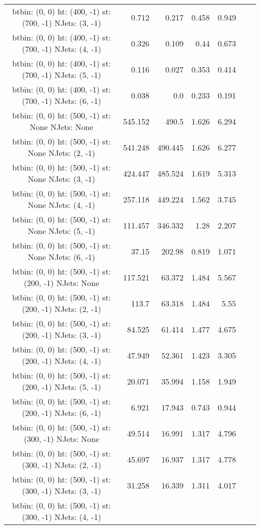 \documentclass[12pt]{paper}
\begin{document}
\begin{landscape}
\begin{longtable}{c|r|r|r|r|r|r}
btbin:  (0, 0) ht:  (400, -1) st:  (700, -1) NJets:  (3, -1)
 & 0.712 & 0.217 & 0.458 & 0.949\\
btbin:  (0, 0) ht:  (400, -1) st:  (700, -1) NJets:  (4, -1)
 & 0.326 & 0.109 & 0.44 & 0.673\\
btbin:  (0, 0) ht:  (400, -1) st:  (700, -1) NJets:  (5, -1)
 & 0.116 & 0.027 & 0.353 & 0.414\\
btbin:  (0, 0) ht:  (400, -1) st:  (700, -1) NJets:  (6, -1)
 & 0.038 & 0.0 & 0.233 & 0.191\\
btbin:  (0, 0) ht:  (500, -1) st:  None NJets:  None
 & 545.152 & 490.5 & 1.626 & 6.294\\
btbin:  (0, 0) ht:  (500, -1) st:  None NJets:  (2, -1)
 & 541.248 & 490.445 & 1.626 & 6.277\\
btbin:  (0, 0) ht:  (500, -1) st:  None NJets:  (3, -1)
 & 424.447 & 485.524 & 1.619 & 5.313\\
btbin:  (0, 0) ht:  (500, -1) st:  None NJets:  (4, -1)
 & 257.118 & 449.224 & 1.562 & 3.745\\
btbin:  (0, 0) ht:  (500, -1) st:  None NJets:  (5, -1)
 & 111.457 & 346.332 & 1.28 & 2.207\\
btbin:  (0, 0) ht:  (500, -1) st:  None NJets:  (6, -1)
 & 37.15 & 202.98 & 0.819 & 1.071\\
btbin:  (0, 0) ht:  (500, -1) st:  (200, -1) NJets:  None
 & 117.521 & 63.372 & 1.484 & 5.567\\
btbin:  (0, 0) ht:  (500, -1) st:  (200, -1) NJets:  (2, -1)
 & 113.7 & 63.318 & 1.484 & 5.55\\
btbin:  (0, 0) ht:  (500, -1) st:  (200, -1) NJets:  (3, -1)
 & 84.525 & 61.414 & 1.477 & 4.675\\
btbin:  (0, 0) ht:  (500, -1) st:  (200, -1) NJets:  (4, -1)
 & 47.949 & 52.361 & 1.423 & 3.305\\
btbin:  (0, 0) ht:  (500, -1) st:  (200, -1) NJets:  (5, -1)
 & 20.071 & 35.994 & 1.158 & 1.949\\
btbin:  (0, 0) ht:  (500, -1) st:  (200, -1) NJets:  (6, -1)
 & 6.921 & 17.943 & 0.743 & 0.944\\
btbin:  (0, 0) ht:  (500, -1) st:  (300, -1) NJets:  None
 & 49.514 & 16.991 & 1.317 & 4.796\\
btbin:  (0, 0) ht:  (500, -1) st:  (300, -1) NJets:  (2, -1)
 & 45.697 & 16.937 & 1.317 & 4.778\\
btbin:  (0, 0) ht:  (500, -1) st:  (300, -1) NJets:  (3, -1)
 & 31.258 & 16.339 & 1.311 & 4.017\\
btbin:  (0, 0) ht:  (500, -1) st:  (300, -1) NJets:  (4, -1)

\end{longtable}
\end{landscape}
\end{document}
